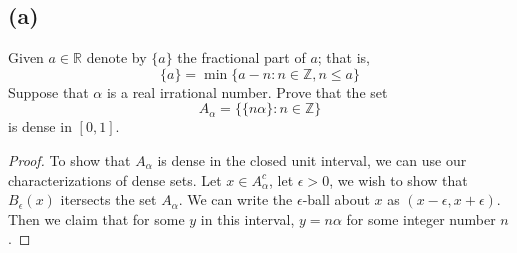 \documentclass{article}
\begin{document}
    \subsection*{(a)} 
        Given $a \in \mathbb{R}$ denote by $\{a\}$ the 
        fractional part of $a$; that is,
        \[ 
            \{a\} = \min \{a-n:n\in\mathbb{Z},n\leq a\}    
        \]
        Suppose that $\alpha$ is a real irrational number. Prove that the set 
        \[
            A_\alpha = \{ \{n\alpha\} : n \in \mathbb{Z}\}
        \]
        is dense in $[0,1]$.
        \begin{proof}
            To show that $A_\alpha$ is dense in the closed unit interval, we can use our characterizations of
            dense sets. Let $x \in A_\alpha^c$, let $\epsilon > 0$, we wish to show that $B_\epsilon(x)$ itersects the set
            $A_\alpha$. We can write the $\epsilon$-ball about $x$ as $(x - \epsilon, x + \epsilon)$. Then we
            claim that for some $y$ in this interval, $y = n \alpha$ for some integer number $n$.
        \end{proof}
\end{document}
